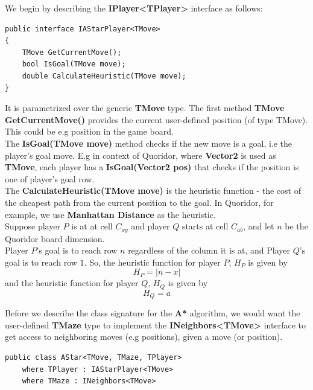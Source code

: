 We begin by describing the \textbf{IPlayer\textless{}TPlayer\textgreater{}} interface as follows:
\begin{lstlisting}
public interface IAStarPlayer<TMove>
{
    TMove GetCurrentMove();
    bool IsGoal(TMove move);
    double CalculateHeuristic(TMove move);
}
\end{lstlisting}
It is parametrized over the generic \textbf{TMove} type. The first method \textbf{TMove GetCurrentMove()} provides the current user-defined position (of type TMove). This could be e.g position in the game board.\\
The \textbf{IsGoal(TMove move)} method checks if the new move is a goal, i.e the player's goal move. E.g in context of Quoridor, where \textbf{Vector2} is used as \textbf{TMove}, each player has a \textbf{IsGoal(Vector2 pos)} that checks if the position is one of player's goal row.\\
The \textbf{CalculateHeuristic(TMove move)} is the heuristic function - the cost of the cheapest path from the current position to the goal. In Quoridor, for example, we use \textbf{Manhattan Distance} as the heuristic.\\
Suppose player $P$ is at at cell $C_{xy}$ and player $Q$ starts at cell $C_{ab}$, and let $n$ be the Quoridor board dimension.\\
Player $P$'s goal is to reach row $n$ regardless of the column it is at, and Player $Q$'s goal is to reach row $1$.
So, the heuristic function for player $P$, $H_P$ is given by
\begin{equation}
\label{eq:playerPHeuristic}
    H_P = | n - x |
\end{equation}
and the heuristic function for player $Q$, $H_Q$ is given by
\begin{equation}
\label{eq:playerQHeuristic}
    H_Q = a
\end{equation}

Before we describe the class signature for the \textbf{A*} algorithm, we would want the user-defined \textbf{TMaze} type to implement the \textbf{INeighbors\textless{}TMove\textgreater{}} interface to get access to neighboring moves (e.g positions), given a move (or position).

\begin{lstlisting}
public class AStar<TMove, TMaze, TPlayer>
    where TPlayer : IAStarPlayer<TMove>
    where TMaze : INeighbors<TMove>
\end{lstlisting}

